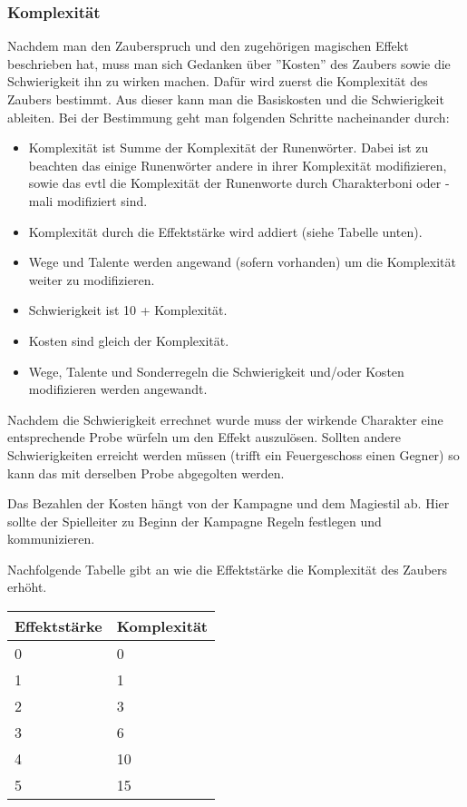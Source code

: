 \documentclass{article}
\begin{document}
\subsubsection{Komplexität}

Nachdem man den Zauberspruch und den zugehörigen magischen Effekt beschrieben hat, muss man sich Gedanken über
''Kosten'' des Zaubers sowie die Schwierigkeit ihn zu wirken machen. Dafür wird zuerst die Komplexität des Zaubers
bestimmt. Aus dieser kann man die Basiskosten und die Schwierigkeit ableiten. Bei der Bestimmung geht man folgenden
Schritte nacheinander durch:

\begin{itemize}
\item Komplexität ist Summe der Komplexität der Runenwörter. Dabei ist zu beachten das einige Runenwörter andere in ihrer Komplexität modifizieren, sowie das evtl die Komplexität der Runenworte durch Charakterboni oder -mali modifiziert sind.
\item Komplexität durch die Effektstärke wird addiert (siehe Tabelle unten).
\item Wege und Talente werden angewand (sofern vorhanden) um die Komplexität weiter zu modifizieren.
\item Schwierigkeit ist 10 + Komplexität.
\item Kosten sind gleich der Komplexität.
\item Wege, Talente und Sonderregeln die Schwierigkeit und/oder Kosten modifizieren werden angewandt.
\end{itemize}

Nachdem die Schwierigkeit errechnet wurde muss der wirkende Charakter eine entsprechende Probe würfeln um den Effekt
auszulösen. Sollten andere Schwierigkeiten erreicht werden müssen (trifft ein Feuergeschoss einen Gegner) so kann das
mit derselben Probe abgegolten werden.

Das Bezahlen der Kosten hängt von der Kampagne und dem Magiestil ab. Hier sollte der Spielleiter zu Beginn der
Kampagne Regeln festlegen und kommunizieren.

Nachfolgende Tabelle gibt an wie die Effektstärke die Komplexität des Zaubers erhöht.


\begin{small}
\begin{tabular}{|m{3cm}|m{3cm}|}
\hline
\textbf{Effektstärke}&\textbf{Komplexität}\\
\hline
\hline
0&0\\
\hline
1&1\\
\hline
2&3\\
\hline
3&6\\
\hline
4&10\\
\hline
5&15\\
\hline
\end{tabular}
\end{small}
\end{document}
